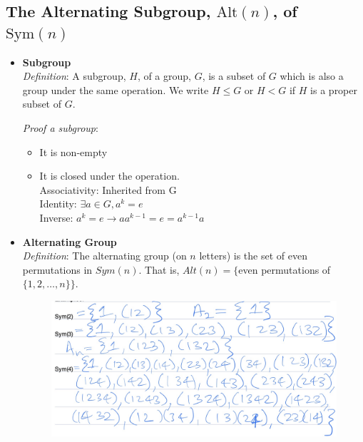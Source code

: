 \documentclass{article}
\begin{document}
\subsection*{The Alternating Subgroup, $\text{Alt}(n)$, of $\text{Sym}(n)$}

\begin{itemize}
    \item \textbf{Subgroup}\\
    \textit{Definition}: A subgroup, $H$, of a group, $G$, is a subset of $G$ which is also a group 
    under the same operation. We write $H \leq G$ or $H < G$ if $H$ is a proper subset of $G$.
    
    \textit{Proof a subgroup}:
    \begin{itemize}
        \item It is non-empty
        \item  It is closed under the operation.\\
        Associativity: Inherited from G\\
        Identity: $\exists a \in G, a^k = e$ \\
        Inverse: $a^k = e \rightarrow aa^{k-1} = e = a^{k-1}a$
    \end{itemize}



    \item \textbf{Alternating Group}\\
    \textit{Definition}: The alternating group (on \(n\) letters) is the set of even permutations 
    in \(Sym(n)\). That is, \(Alt(n) = \{\)even permutations of \(\{1, 2, \ldots, n\}\}\).
    \begin{figure}[htbp]
        \centering %
        \includegraphics[width=1.0\textwidth]{Graphs/Alternative_Group.jpg} %
    \end{figure}

\end{itemize}
\end{document}
